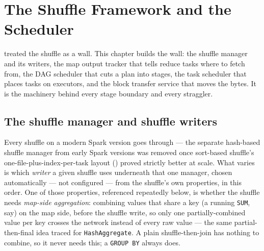 \chapter{The Shuffle Framework and the Scheduler}
\label{ch:scheduler}

\begin{chapterintro}
 treated the shuffle as a wall. This chapter builds the wall:
the shuffle manager and its writers, the map output tracker that tells reduce
tasks where to fetch from, the DAG scheduler that cuts a plan into stages, the
task scheduler that places tasks on executors, and the block transfer service
that moves the bytes. It is the machinery behind every stage boundary and every
straggler.
\end{chapterintro}

\section{The shuffle manager and shuffle writers}
\label{sec:sched-shuffle-manager}

Every shuffle on a modern Spark version goes through 
--- the separate hash-based shuffle manager from early Spark versions was
removed once sort-based shuffle's one-file-plus-index-per-task layout
() proved strictly better at scale. What varies is
which \emph{writer} a given shuffle uses underneath that one manager, chosen
automatically --- not configured --- from the shuffle's own properties, in
this order. One of those properties, referenced repeatedly below, is whether
the shuffle needs \emph{map-side aggregation}: combining values that share a
key (a running \texttt{SUM}, say) on the map side, before the shuffle write,
so only one partially-combined value per key crosses the network instead of
every raw value --- the same partial-then-final idea 
traced for \texttt{HashAggregate}. A plain shuffle-then-join has nothing to
combine, so it never needs this; a \texttt{GROUP BY} always does.

